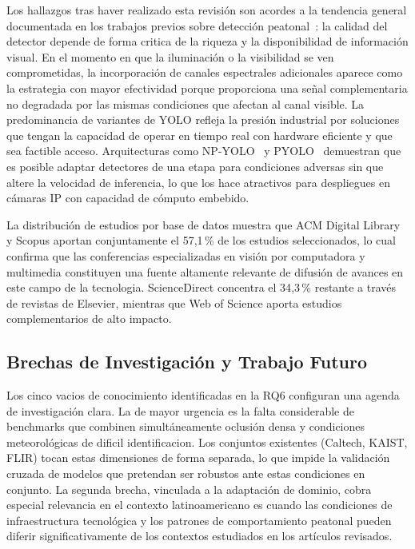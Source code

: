 \documentclass[12pt, a4paper]{article}
\begin{document}
Los hallazgos tras haver realizado esta revisi\'{o}n son 
acordes a la tendencia general documentada en los trabajos previos
sobre detecci\'{o}n peatonal~\cite{Brunetti2018, Dollar2012}: la
calidad del detector depende de forma critica de la riqueza y la
disponibilidad de informaci\'{o}n visual. En el momento en que la iluminaci\'{o}n o
la visibilidad se ven comprometidas, la incorporaci\'{o}n de canales
espectrales adicionales aparece como la estrategia con mayor efectividad
porque proporciona una se\~{n}al complementaria no degradada por las
mismas condiciones que afectan al canal visible. La predominancia de
variantes de YOLO refleja la presi\'{o}n industrial por soluciones que tengan
la capacidad de operar en tiempo real con hardware eficiente y que sea factible acceso.
Arquitecturas como NP-YOLO~\cite{E12} y PYOLO~\cite{E18} demuestran
que es posible adaptar detectores de una etapa para condiciones
adversas sin que altere la velocidad de inferencia, lo que los hace
atractivos para despliegues en c\'{a}maras IP con capacidad de
c\'{o}mputo embebido.

La distribuci\'{o}n de estudios por base de datos muestra que ACM
Digital Library y Scopus aportan conjuntamente el 57{,}1\,\% de los
estudios seleccionados, lo cual confirma que las conferencias
especializadas en visi\'{o}n por computadora y multimedia constituyen
una fuente altamente relevante de difusi\'{o}n de avances en este campo de la tecnologia.
ScienceDirect concentra el 34{,}3\,\% restante a trav\'{e}s de
revistas de Elsevier, mientras que Web of Science aporta estudios
complementarios de alto impacto.

\subsection{Brechas de Investigaci\'{o}n y Trabajo Futuro}

Los cinco vacios de conocimiento identificadas en la RQ6 configuran
una agenda de investigaci\'{o}n clara. La de mayor urgencia es la
falta considerable de benchmarks que combinen simult\'{a}neamente
oclusi\'{o}n densa y condiciones meteorol\'{o}gicas de dificil identificacion. Los
conjuntos existentes (Caltech, KAIST, FLIR) tocan estas dimensiones
de forma separada, lo que impide la validaci\'{o}n cruzada de modelos
que pretendan ser robustos ante estas condiciones en conjunto. La segunda brecha,
vinculada a la adaptaci\'{o}n de dominio, cobra especial relevancia en
el contexto latinoamericano es cuando las condiciones de infraestructura
tecnol\'{o}gica y los patrones de comportamiento peatonal pueden
diferir significativamente de los contextos estudiados en los
art\'{i}culos revisados.
\end{document}

